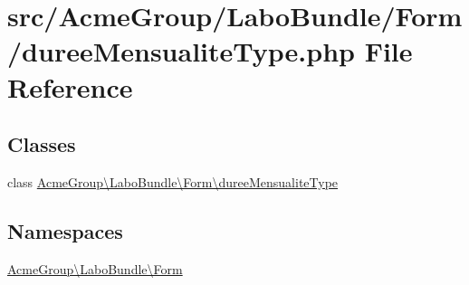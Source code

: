 \hypertarget{duree_mensualite_type_8php}{\section{src/\+Acme\+Group/\+Labo\+Bundle/\+Form/duree\+Mensualite\+Type.php File Reference}
\label{duree_mensualite_type_8php}
}
\subsection*{Classes}
\begin{DoxyCompactItemize}
\item 
class \hyperlink{class_acme_group_1_1_labo_bundle_1_1_form_1_1duree_mensualite_type}{Acme\+Group\textbackslash{}\+Labo\+Bundle\textbackslash{}\+Form\textbackslash{}duree\+Mensualite\+Type}
\end{DoxyCompactItemize}
\subsection*{Namespaces}
\begin{DoxyCompactItemize}
\item 
 \hyperlink{namespace_acme_group_1_1_labo_bundle_1_1_form}{Acme\+Group\textbackslash{}\+Labo\+Bundle\textbackslash{}\+Form}
\end{DoxyCompactItemize}
